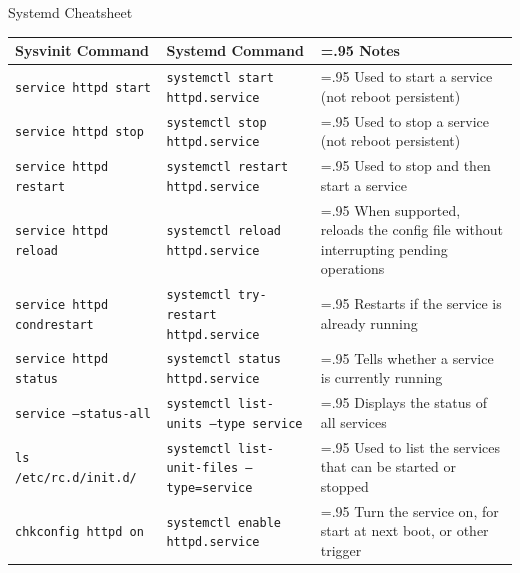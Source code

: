 \documentclass[a4paper]{article}
\begin{document}
\begin{center}

{\huge Systemd Cheatsheet}

\vspace{7mm}
\small

\begin{tabularx}{\textwidth}{ |l|>{\hsize=1.05\hsize}X|>{\hsize=.95\hsize}X| }
\hline
\rowcolor[gray]{.8}
\bfseries Sysvinit Command    & \bfseries Systemd Command                                                             & \bfseries Notes \\\hline
\tt service httpd start       & \tt systemctl start httpd.service                                                     & Used to start a service (not reboot persistent) \\\hline
\tt service httpd stop        & \tt systemctl stop httpd.service                                                      & Used to stop a service (not reboot persistent) \\\hline
\tt service httpd restart     & \tt systemctl restart httpd.service                                                   & Used to stop and then start a service \\\hline
\tt service httpd reload      & \tt systemctl reload httpd.service                                                    & When supported, reloads the config file without interrupting pending operations \\\hline
\tt service httpd condrestart & \tt systemctl try-restart httpd.service                                               & Restarts if the service is already running \\\hline
\tt service httpd status      & \tt systemctl status httpd.service                                                    & Tells whether a service is currently running \\\hline
\tt service --status-all      & \tt systemctl list-units --type service                                               & Displays the status of all services \\\hline
\tt ls /etc/rc.d/init.d/      & \tt systemctl list-unit-files --type=service                                          & Used to list the services that can be started or stopped \\\hline
\tt chkconfig httpd on        & \tt systemctl enable httpd.service                                                    & Turn the service on, for start at next boot, or other trigger \\\hline

\end{tabularx}
\end{center}
\end{document}

